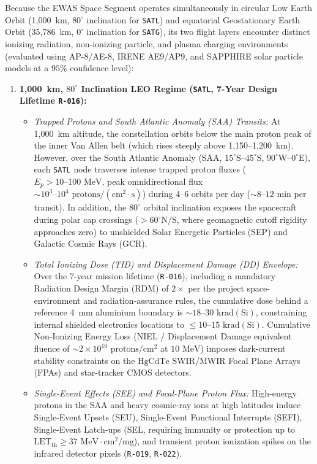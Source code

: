 \documentclass[11pt,a4paper]{article}
\providecommand{\abbr}[1]{#1}
\begin{document}
Because the \abbr{EWAS} Space Segment operates simultaneously in circular Low Earth Orbit (1,000~km, $80^\circ$ inclination for \texttt{SATL}) and equatorial Geostationary Earth Orbit (35,786~km, $0^\circ$ inclination for \texttt{SATG}), its two flight layers encounter distinct ionizing radiation, non-ionizing particle, and plasma charging environments (evaluated using AP-8/AE-8, IRENE AE9/AP9, and SAPPHIRE solar particle models at a $95\%$ confidence level):
\begin{enumerate}
    \item \textbf{1,000~km, $80^\circ$ Inclination \abbr{LEO} Regime (\texttt{SATL}, 7-Year Design Lifetime \texttt{R-016}):}
    \begin{itemize}
        \item \emph{Trapped Protons and South Atlantic Anomaly (\abbr{SAA}) Transits:} At 1,000~km altitude, the constellation orbits below the main proton peak of the inner Van Allen belt (which rises steeply above 1,150--1,200~km). However, over the South Atlantic Anomaly (\abbr{SAA}, $15^\circ\text{S}\text{--}45^\circ\text{S}$, $90^\circ\text{W}\text{--}0^\circ\text{E}$), each \texttt{SATL} node traverses intense trapped proton fluxes ($E_p > 10\text{--}100\text{ MeV}$, peak omnidirectional flux $\sim 10^3\text{--}10^4\text{ protons}/(\text{cm}^2\cdot\text{s})$) during 4--6 orbits per day ($\sim 8\text{--}12\text{ min}$ per transit). In addition, the $80^\circ$ orbital inclination exposes the spacecraft during polar cap crossings ($> 60^\circ\text{N/S}$, where geomagnetic cutoff rigidity approaches zero) to unshielded Solar Energetic Particles (\abbr{SEP}) and Galactic Cosmic Rays (\abbr{GCR}).
        \item \emph{Total Ionizing Dose (\abbr{TID}) and Displacement Damage (\abbr{DD}) Envelope:} Over the 7-year mission lifetime (\texttt{R-016}), including a mandatory Radiation Design Margin (\abbr{RDM}) of $2\times$ per the project space-environment and radiation-assurance rules, the cumulative dose behind a reference 4~mm aluminium boundary is $\sim 18\text{--}30\text{ krad}(\mathrm{Si})$, constraining internal shielded electronics locations to $\le 10\text{--}15\text{ krad}(\mathrm{Si})$. Cumulative Non-Ionizing Energy Loss (\abbr{NIEL} / Displacement Damage equivalent fluence of $\sim 2 \times 10^{10}\text{ protons}/\text{cm}^2$ at $10\text{ MeV}$) imposes dark-current stability constraints on the $\mathrm{HgCdTe}$ \abbr{SWIR}/\abbr{MWIR} Focal Plane Arrays (\abbr{FPA}s) and star-tracker CMOS detectors.
        \item \emph{Single-Event Effects (\abbr{SEE}) and Focal-Plane Proton Flux:} High-energy protons in the \abbr{SAA} and heavy cosmic-ray ions at high latitudes induce Single-Event Upsets (\abbr{SEU}), Single-Event Functional Interrupts (\abbr{SEFI}), Single-Event Latch-ups (\abbr{SEL}, requiring immunity or protection up to $\text{LET}_{\text{th}} \ge 37\text{ MeV}\cdot\text{cm}^2/\text{mg}$), and transient proton ionization spikes on the infrared detector pixels (\texttt{R-019}, \texttt{R-022}).

\end{itemize}
\end{enumerate}
\end{document}
